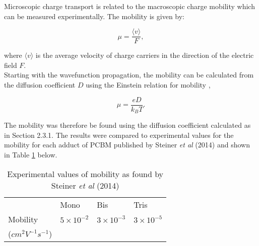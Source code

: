 \documentclass[a4paper,12pt]{article}
\begin{document}
\noindent  Microscopic charge transport is related to the macroscopic charge mobility which can be measured experimentally. The mobility is given by:

\begin{equation}
\mu = \frac{\langle v \rangle}{F},
\label{eq:mu}
\end{equation}

\noindent where $\langle v \rangle$ is the average velocity of charge carriers in the direction of the electric field $F$.\\

\noindent Starting with the wavefunction propagation, the mobility can be calculated from the diffusion coefficient $D$ using the Einstein relation for mobility \cite{Einstein},

\begin{equation}
\mu=\frac{eD}{k_B T}.
\label{eq:einstein}
\end{equation}

\noindent The mobility was therefore be found using the diffusion coefficient calculated as in Section 2.3.1. The results were compared to experimental values for the mobility for each adduct of PCBM published by Steiner \textit{et al} (2014) \cite{Steiner} and shown in Table \ref{table:mob} below.

\begin{table}[H]
\caption{Experimental values of mobility as found by Steiner \textit{et al} (2014)}
\centering
\begin{tabular}{llll}
                     &                                           &                                           &                              \\ \hline
                     & Mono                                      & \cellcolor[HTML]{FFFFFF}Bis               & \cellcolor[HTML]{FFFFFF}Tris \\ \hline
Mobility             & \cellcolor[HTML]{FFFFFF}$5\times 10^{-2}$ & \cellcolor[HTML]{FFFFFF}$3\times 10^{-3}$ & $3\times10^{-5}$             \\
($cm^2V^{-1}s^{-1}$) &                                           &                                           &                              \\ \hline
\end{tabular}
\label{table:mob}
\end{table}
\end{document}
